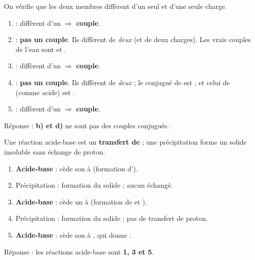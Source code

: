 \documentclass[11pt,a4paper]{article}
\begin{document}

\begin{corrige}
On vérifie que les deux membres diffèrent d'un seul  et d'une seule charge.
\begin{enumerate}[label=\alph*)]
  \item {} : diffèrent d'un  $\Rightarrow$ \textbf{couple}.
  \item {} : \textbf{pas un couple}. Ils diffèrent de \emph{deux}  (et de deux charges). Les
        vrais couples de l'eau sont  et .
  \item {} : diffèrent d'un  $\Rightarrow$ \textbf{couple}.
  \item {} : \textbf{pas un couple}. Ils diffèrent de \emph{deux}  ; le conjugué de
         est , et celui de  (comme acide) est .
  \item {} : diffèrent d'un  $\Rightarrow$ \textbf{couple}.
\end{enumerate}
Réponse : \textbf{b) et d)} ne sont pas des couples conjugués.
\end{corrige}

\begin{corrige}
Une réaction acide-base est un \textbf{transfert de } ; une précipitation forme un solide insoluble sans
échange de proton.
\begin{enumerate}[label=\arabic*)]
  \item \textbf{Acide-base} :  cède son  à  (formation d').
  \item Précipitation : formation du solide  ; aucun  échangé.
  \item \textbf{Acide-base} :  cède un  à  (formation de  et ).
  \item Précipitation : formation du solide  ; pas de transfert de proton.
  \item \textbf{Acide-base} :  cède son  à , qui donne .
\end{enumerate}
Réponse : les réactions acide-base sont \textbf{1, 3 et 5}.
\end{corrige}
\end{document}
